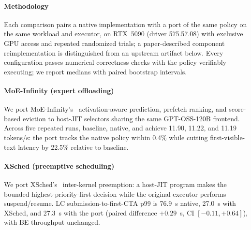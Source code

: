 \paragraph{Methodology}
Each comparison pairs a native implementation with a \sys{} port of the same policy on the same workload and executor, on RTX~5090 (driver 575.57.08) with exclusive GPU access and repeated randomized trials; a paper-described component reimplementation is distinguished from an upstream artifact below.
Every configuration passes numerical correctness checks with the policy verifiably executing; we report medians with paired bootstrap intervals.

\paragraph{MoE-Infinity (expert offloading)}
We port MoE-Infinity's~\cite{xue2025moeinfinity} activation-aware prediction, prefetch ranking, and score-based eviction to host-JIT \sys{} selectors sharing the same GPT-OSS-120B frontend.
Across five repeated runs, baseline, native, and \sys{} achieve 11.90, 11.22, and 11.19 tokens/s: the \sys{} port tracks the native policy within 0.4\% while cutting first-visible-text latency by 22.5\% relative to baseline.

\paragraph{XSched (preemptive scheduling)}
We port XSched's~\cite{shen2025xsched} inter-kernel preemption: a host-JIT \sys{} program makes the bounded highest-priority-first decision while the original executor performs suspend/resume.
LC submission-to-first-CTA p99 is 76.9~s native, 27.0~s with XSched, and 27.3~s with the \sys{} port (paired difference $+0.29$~s, CI $[-0.11,+0.64]$), with BE throughput unchanged.

